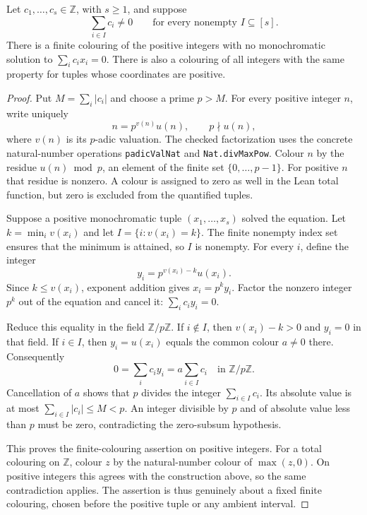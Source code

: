 \begin{theorem}
\label{qr:necessity}
\leanok
Let $c_1,\ldots,c_s\in\mathbb Z$, with $s\ge1$, and suppose
\[
 \sum_{i\in I}c_i\ne0
 \qquad\text{for every nonempty }I\subseteq[s].
\]
There is a finite colouring of the positive integers with no
monochromatic solution to $\sum_i c_ix_i=0$.
There is also a colouring of all integers with the same property
for tuples whose coordinates are positive.
\end{theorem}
\begin{proof}
Put $M=\sum_i|c_i|$ and choose a prime $p>M$.
For every positive integer $n$, write uniquely
\[
 n=p^{v(n)}u(n),\qquad p\nmid u(n),
\]
where $v(n)$ is its $p$-adic valuation.
The checked factorization uses the concrete natural-number operations
\texttt{padicValNat} and \texttt{Nat.divMaxPow}.
Colour $n$ by the residue $u(n)\bmod p$, an element of the finite
set $\{0,\ldots,p-1\}$.
For positive $n$ that residue is nonzero.
A colour is assigned to zero as well in the Lean total function,
but zero is excluded from the quantified tuples.

Suppose a positive monochromatic tuple $(x_1,\ldots,x_s)$ solved
the equation.  Let $k=\min_i v(x_i)$ and let
$I=\{i:v(x_i)=k\}$.
The finite nonempty index set ensures that the minimum is attained,
so $I$ is nonempty.
For every $i$, define the integer
\[
 y_i=p^{v(x_i)-k}u(x_i).
\]
Since $k\le v(x_i)$, exponent addition gives $x_i=p^k y_i$.
Factor the nonzero integer $p^k$ out of the equation and cancel it:
$\sum_i c_i y_i=0$.

Reduce this equality in the field $\mathbb Z/p\mathbb Z$.
If $i\notin I$, then $v(x_i)-k>0$ and $y_i=0$ in that field.
If $i\in I$, then $y_i=u(x_i)$ equals the common colour
$a\ne0$ there.
Consequently
\[
 0=\sum_i c_i y_i=a\sum_{i\in I}c_i
 \quad\text{in }\mathbb Z/p\mathbb Z.
\]
Cancellation of $a$ shows that $p$ divides the integer
$\sum_{i\in I}c_i$.
Its absolute value is at most
$\sum_{i\in I}|c_i|\le M<p$.
An integer divisible by $p$ and of absolute value less than $p$
must be zero, contradicting the zero-subsum hypothesis.

This proves the finite-colouring assertion on positive integers.
For a total colouring on $\mathbb Z$, colour $z$ by the natural-number
colour of $\max(z,0)$.
On positive integers this agrees with the construction above, so the
same contradiction applies.
The assertion is thus genuinely about a fixed finite colouring,
chosen before the positive tuple or any ambient interval.
\end{proof}
